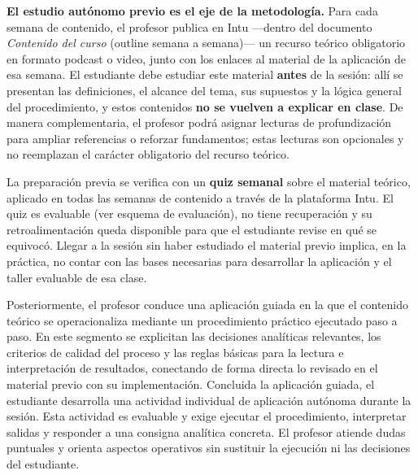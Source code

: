 \documentclass[11pt,a4paper]{article}
\begin{document}
\vspace{0.3cm}

\textbf{El estudio autónomo previo es el eje de la metodología.} Para cada semana de contenido, el profesor publica en Intu ---dentro del documento \textit{Contenido del curso} (outline semana a semana)--- un recurso teórico obligatorio en formato podcast o video, junto con los enlaces al material de la aplicación de esa semana. El estudiante debe estudiar este material \textbf{antes} de la sesión: allí se presentan las definiciones, el alcance del tema, sus supuestos y la lógica general del procedimiento, y estos contenidos \textbf{no se vuelven a explicar en clase}. De manera complementaria, el profesor podrá asignar lecturas de profundización para ampliar referencias o reforzar fundamentos; estas lecturas son opcionales y no reemplazan el carácter obligatorio del recurso teórico.

\vspace{0.3cm}

La preparación previa se verifica con un \textbf{quiz semanal} sobre el material teórico, aplicado en todas las semanas de contenido a través de la plataforma Intu. El quiz es evaluable (ver esquema de evaluación), no tiene recuperación y su retroalimentación queda disponible para que el estudiante revise en qué se equivocó. Llegar a la sesión sin haber estudiado el material previo implica, en la práctica, no contar con las bases necesarias para desarrollar la aplicación y el taller evaluable de esa clase.

\vspace{0.3cm}

Posteriormente, el profesor conduce una aplicación guiada en la que el contenido teórico se operacionaliza mediante un procedimiento práctico ejecutado paso a paso. En este segmento se explicitan las decisiones analíticas relevantes, los criterios de calidad del proceso y las reglas básicas para la lectura e interpretación de resultados, conectando de forma directa lo revisado en el material previo con su implementación. Concluida la aplicación guiada, el estudiante desarrolla una actividad individual de aplicación autónoma durante la sesión. Esta actividad es evaluable y exige ejecutar el procedimiento, interpretar salidas y responder a una consigna analítica concreta. El profesor atiende dudas puntuales y orienta aspectos operativos sin sustituir la ejecución ni las decisiones del estudiante.

\vspace{0.3cm}
\end{document}
